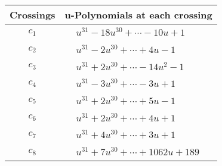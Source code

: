 \documentclass[1p]{elsarticle_modified}
\theoremstyle{definition}
\begin{document}
\begin{tabular}{m{50pt}|m{274pt}}
Crossings & \hspace{64pt}u-Polynomials at each crossing \\
\hline $$\begin{aligned}c_{1}\end{aligned}$$&$\begin{aligned}
&u^{31}-18 u^{30}+\cdots-10 u+1
\end{aligned}$\\
\hline $$\begin{aligned}c_{2}\end{aligned}$$&$\begin{aligned}
&u^{31}-2 u^{30}+\cdots+4 u-1
\end{aligned}$\\
\hline $$\begin{aligned}c_{3}\end{aligned}$$&$\begin{aligned}
&u^{31}+2 u^{30}+\cdots-14 u^2-1
\end{aligned}$\\
\hline $$\begin{aligned}c_{4}\end{aligned}$$&$\begin{aligned}
&u^{31}-3 u^{30}+\cdots-3 u+1
\end{aligned}$\\
\hline $$\begin{aligned}c_{5}\end{aligned}$$&$\begin{aligned}
&u^{31}+2 u^{30}+\cdots+5 u-1
\end{aligned}$\\
\hline $$\begin{aligned}c_{6}\end{aligned}$$&$\begin{aligned}
&u^{31}+2 u^{30}+\cdots+4 u+1
\end{aligned}$\\
\hline $$\begin{aligned}c_{7}\end{aligned}$$&$\begin{aligned}
&u^{31}+4 u^{30}+\cdots+3 u+1
\end{aligned}$\\
\hline $$\begin{aligned}c_{8}\end{aligned}$$&$\begin{aligned}
&u^{31}+7 u^{30}+\cdots+1062 u+189
\end{aligned}$\\

\end{tabular}
\end{document}
